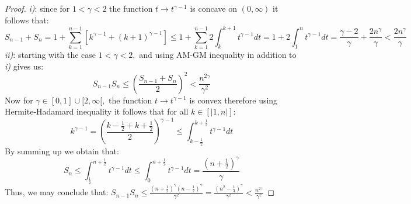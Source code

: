 \documentclass[11pt]{amsart}
\newcommand{\1}{[1]}
\begin{document}
\begin{proof} 
\textit{ i)}: since for $1 < \gamma < 2$ the function $t \to t^{\gamma-1}$ is concave on $(0,\infty)$ it follows that:
$$ S_{n-1}+S_{n} = 1+ \sum_{k=1}^{n-1} \left[ k^{\gamma-1} + (k+1)^{\gamma-1} \right]
\leq 1+ \sum_{k=1}^{n-1} 2 \int_{k}^{k+1} t^{\gamma-1} dt = 1+ 2 \int_{1}^{n} t^{\gamma-1} dt = \frac{\gamma-2}{\gamma} + \frac{2 n^{\gamma}}{\gamma} <  \frac{2 n^{\gamma}}{\gamma}  $$
\textit{ ii)}: starting with the case $1 < \gamma < 2,$ and using AM-GM inequality in addition to \textit{i)} gives us:
$$S_{n-1} S_{n} \leq  \left( \frac{S_{n-1}+S_{n}}{2} \right )^2  <  \frac{n^{2 \gamma}}{\gamma^2}$$
Now for $\gamma \in [0,1] \cup [2,\infty[,$ the function $t \to t^{\gamma-1}$ is convex therefore using Hermite-Hadamard inequality it follows that for all $k \in [|1,n|]:$
$$
k^{\gamma-1} = \left( \frac{k-\frac{1}{2}+  k+\frac{1}{2}}{2} \right)^{\gamma-1} \leq  \int_{k- \frac{1}{2}}^{k+ \frac{1}{2}} t^{\gamma-1} dt $$
By summing up we obtain that:
$$ S_{n} \leq \int_{\frac{1}{2}}^{n+\frac{1}{2}} t^{\gamma-1} dt \leq   \int_{0}^{n+\frac{1}{2}} t^{\gamma-1} dt  = \frac{(n+\frac{1}{2})^{\gamma}}{\gamma} $$
Thus, we may conclude that:
$ \displaystyle S_{n-1} S_{n} \leq  \frac{(n+\frac{1}{2} )^{\gamma} (n-\frac{1}{2})^{\gamma}}{\gamma^2} = \frac{(n^2-\frac{1}{4})^{\gamma}}{\gamma^2} < \frac{n^{2 \gamma}}{\gamma^2}$


\end{proof}
\end{document}

